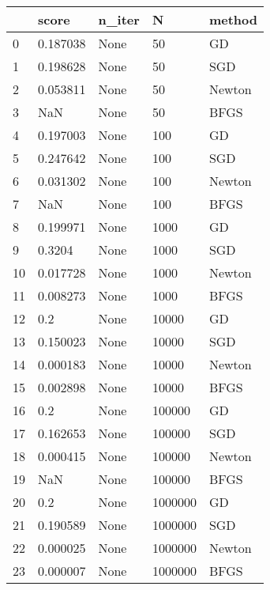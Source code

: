 \begin{tabular}{lllll}
\toprule
{} &     score & n\_iter &        N &  method \\
\midrule
0  &  0.187038 &   None &       50 &      GD \\
1  &  0.198628 &   None &       50 &     SGD \\
2  &  0.053811 &   None &       50 &  Newton \\
3  &       NaN &   None &       50 &    BFGS \\
4  &  0.197003 &   None &      100 &      GD \\
5  &  0.247642 &   None &      100 &     SGD \\
6  &  0.031302 &   None &      100 &  Newton \\
7  &       NaN &   None &      100 &    BFGS \\
8  &  0.199971 &   None &     1000 &      GD \\
9  &    0.3204 &   None &     1000 &     SGD \\
10 &  0.017728 &   None &     1000 &  Newton \\
11 &  0.008273 &   None &     1000 &    BFGS \\
12 &       0.2 &   None &    10000 &      GD \\
13 &  0.150023 &   None &    10000 &     SGD \\
14 &  0.000183 &   None &    10000 &  Newton \\
15 &  0.002898 &   None &    10000 &    BFGS \\
16 &       0.2 &   None &   100000 &      GD \\
17 &  0.162653 &   None &   100000 &     SGD \\
18 &  0.000415 &   None &   100000 &  Newton \\
19 &       NaN &   None &   100000 &    BFGS \\
20 &       0.2 &   None &  1000000 &      GD \\
21 &  0.190589 &   None &  1000000 &     SGD \\
22 &  0.000025 &   None &  1000000 &  Newton \\
23 &  0.000007 &   None &  1000000 &    BFGS \\
\bottomrule
\end{tabular}
